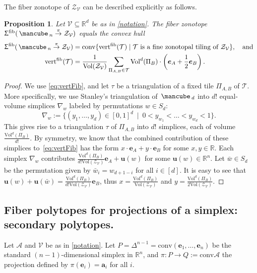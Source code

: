 \documentclass[11pt]{amsart}
\theoremstyle{plain}
\newtheorem{proposition}[theorem]{Proposition}
\theoremstyle{definition}
\def\R{\mathbb{R}}
\def\u{{\bm{u}}}
\def\A{\mathcal{A}}
\def\V{\mathcal{V}}
\def\e{{\bm{e}}}
\def\a{{\bm{a}}}
\def\conv{\mathrm{conv}}
\def\Zon{\mathcal{Z}}
\def\ZV{\Zon_\V}
\def\cube{\mbox{\,\mancube\,}}
\def\Vol{\mathrm{Vol}}
\def\vert{\mathrm{vert}}
\def\vertFib{\vert^\fiber}
\def\fiber{{\operatorname{fib}}}
\def\FibPoly{\Upsigma^\fiber}
\def\pito{\overset \pi \to}
\def\VC{\V}
\def\Tcal{\mathcal{T}}
\def\Tiling{\Tcal}
\def\tile{\Pi}
\def\VolX(#1){\Vol^d(\tile_{#1})}
\def\VolB{\VolX(B)}
\let\subset\subseteq
\begin{document}
The fiber zonotope of $\ZV$ can be described explicitly as follows.

\begin{proposition}\label{prop:vertFib}
	Let $\V  \subset \R^d$ be as in \cref{notation}.
The fiber zonotope $\FibPoly(\cube_n\pito \Zon_\VC)$ equals the convex hull
\begin{align}
  \FibPoly(\cube_n\pito \Zon_\VC)&=\conv\{\vertFib(\Tiling)\mid \Tiling\text{ is a fine zonotopal tiling of $\Zon_\VC$}\},\quad\text{and} \\
\label{eq:vertFibzon}
  \vertFib(\Tiling)&=\frac1{\Vol(\ZV)} \sum_{\tile_{A,B}\in \Tiling} \VolB\cdot \left(\e_A+\frac12 \e_B \right).
\end{align}
\end{proposition}

\begin{proof}
We use \eqref{eq:vertFib}, 
	and let $\tau$ be a triangulation of a fixed tile 
	$\tile_{A,B}$ of  
	$\Tiling$.  More specifically, we use Stanley's  
	triangulation \cite{Sta77} of $\cube_d$ into $d!$ 
	equal-volume simplices 
	$\nabla_w$ labeled by permutations $w\in S_d$:
	\begin{equation}\label{eq:Stanley}
		\nabla_w := \{(y_1,\dots,y_d) \in [0,1]^d \ \mid \ 
	0 < y_{w_1} < \dots < y_{w_d} < 1\}.
	\end{equation}
	This gives 
	rise to a triangulation $\tau$ of 
	 $\tile_{A,B}$ into $d!$ simplices, 
	 each of volume $\frac{\VolB}{d!}$. 
	 By symmetry, we know that the combined contribution of these simplices to~\eqref{eq:vertFib} has the form $x\cdot  \e_A+y\cdot \e_B$ for some $x,y\in\R$. Each simplex $\nabla_w$ contributes $\frac{\VolB}{d!\Vol(\ZV)} \e_A+\u(w)$ for some $\u(w)\in\R^n$. Let $\bar w\in S_d$ be the permutation given by $\bar w_i=w_{d+1-i}$ for all $i\in[d]$. It is easy to see that $\u(w)+ \u(\bar w)=\frac{\VolB}{d!\Vol(\ZV)} \e_B$, thus $x=\frac{\VolB}{\Vol(\ZV)}$ and $y=\frac{\VolB}{2\Vol(\ZV)}$. 
\end{proof}

\subsection{Fiber polytopes for projections of a simplex:  secondary polytopes.}\label{sec:fiber-secondary}

Let $\A$ and $\V$ be as in \cref{notation}.
Let $P=\Delta^{n-1}=\conv(\e_1,\dots,\e_n)$ be the standard $(n-1)$-dimensional
simplex in $\R^n$, 
and $\pi:P \to Q:=\conv{\A}$ the projection defined
by $\pi(\e_i) = \a_i$ for all $i$.
\end{document}
